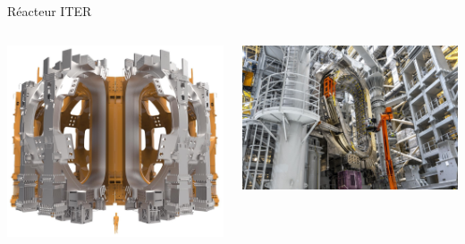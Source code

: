 \documentclass{beamer}
\begin{document}
\begin{frame}{Réacteur ITER}
  \begin{columns}
    \begin{center}
      \includegraphics[width=\textwidth]{figures/iter_toroidal_coil.jpg}
    \end{center}
    \begin{center}
      \includegraphics[width=\textwidth]{figures/sector_6_sub_assembly_3_small.jpg}
    \end{center}
  \end{columns}
\end{frame}
\end{document}
